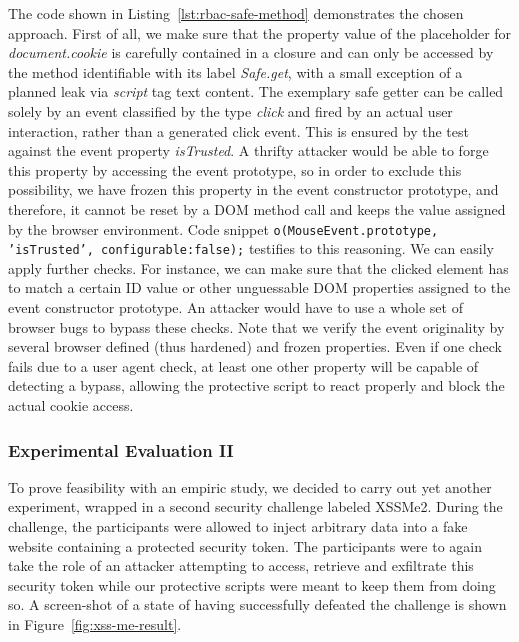       The code shown in Listing~\ref{lst:rbac-safe-method} demonstrates the chosen approach. First of all, we make sure that the property value of the placeholder for \textit{document.cookie} is carefully contained in a closure and can only be accessed by the method identifiable with its label \textit{Safe.get}, with a small exception of a planned leak via \textit{script} tag text content. The exemplary safe getter can be called solely by an event classified by the type \textit{click} and fired by an actual user interaction, rather than a generated click event. This is ensured by the test against the event property \textit{isTrusted}. A thrifty attacker would be able to forge this property by accessing the event prototype, so in order to exclude this possibility, we have frozen this property in the event constructor prototype, and therefore, it cannot be reset by a DOM method call and keeps the value assigned by the browser environment. Code snippet \texttt{o(MouseEvent.prototype, 'isTrusted', {configurable:false});} testifies to this reasoning. We can easily apply further checks. For instance, we can make sure that the clicked element has to match a certain ID value or other unguessable DOM properties assigned to the event constructor prototype. An attacker would have to use a whole set of browser bugs to bypass these checks. Note that we verify the event originality by several browser defined (thus hardened) and frozen properties. Even if one check fails due to a user agent check, at least one other property will be capable of detecting a bypass, allowing the protective script to react properly and block the actual cookie access. \\

      \subsubsection{Experimental Evaluation II}

      To prove feasibility with an empiric study, we decided to carry out yet another experiment, wrapped in a second security challenge labeled XSSMe2. During the challenge, the participants were allowed to inject arbitrary data into a fake website containing a protected security token. The participants were to again take the role of an attacker attempting to access, retrieve and exfiltrate this security token while our protective scripts were meant to keep them from doing so. A screen-shot of a state of having successfully defeated the challenge is shown in Figure~\ref{fig:xss-me-result}.\\

